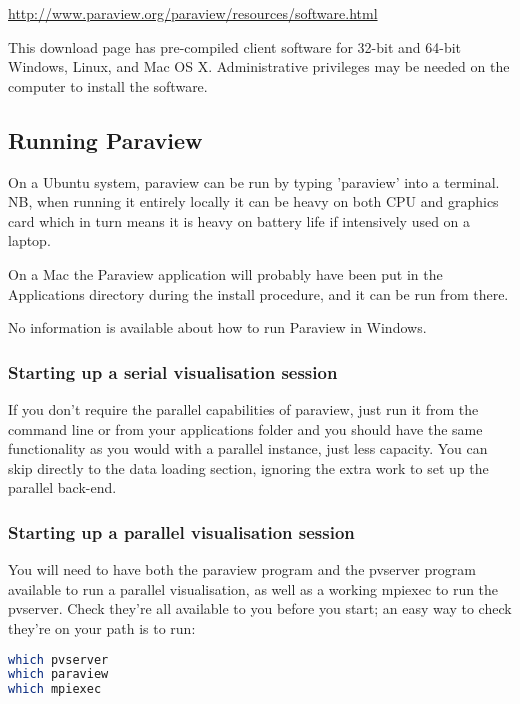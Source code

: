 \url{http://www.paraview.org/paraview/resources/software.html}

This download page has pre-compiled client software for 32-bit and 64-bit
Windows, Linux, and Mac OS X. Administrative privileges may be needed on the
computer to install the software.

\subsection{Running Paraview}

On a Ubuntu system, paraview can be run by typing 'paraview' into a
terminal. NB, when running it entirely locally it can be heavy on both CPU
and graphics card which in turn means it is heavy on battery life if
intensively used on a laptop.

On a Mac the Paraview application will probably have been put in the
Applications directory during the install procedure, and it can be run from
there.

No information is available about how to run Paraview in Windows. 

\subsubsection{Starting up a serial visualisation session}

If you don't require the parallel capabilities of paraview, just run it from
the command line or from your applications folder and you should have the
same functionality as you would with a parallel instance, just less
capacity. You can skip directly to the data loading section, ignoring the
extra work to set up the parallel back-end.

\subsubsection{Starting up a parallel visualisation session}

You will need to have both the paraview program and the pvserver program
available to run a parallel visualisation, as well as a working mpiexec to
run the pvserver. Check they're all available to you before you start; an
easy way to check they're on your path is to run:

\begin{example}
  \begin{lstlisting}[language=bash]
which pvserver
which paraview
which mpiexec
\end{lstlisting}
\end{example}

